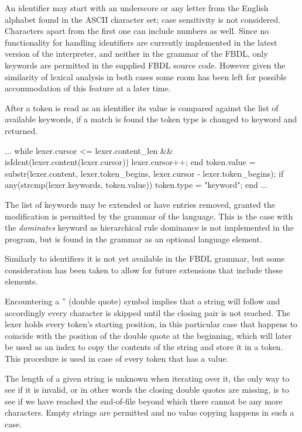 An identifier may start with an underscore or any letter from the English alphabet found in the ASCII character set; case sensitivity is not considered. Characters apart from the first one can include numbers as well. Since no functionality for handling identifiers are currently implemented in the latest version of the interpreter, and neither in the grammar of the FBDL, only keywords are permitted in the supplied FBDL source code. However given the similarity of lexical analysis in both cases some room has been left for possible accommodation of this feature at a later time.

After a token is read as an identifier its value is compared against the list of available keywords, if a match is found the token type is changed to keyword and returned.

\begin{octave}
...
while lexer.cursor <= lexer.content_len &&
		isIdent(lexer.content(lexer.cursor))
  lexer.cursor++;
end
token.value = substr(lexer.content, lexer.token_begins,
		lexer.cursor - lexer.token_begins);
if any(strcmp(lexer.keywords, token.value))
  token.type = "keyword";
end
...
\end{octave}

The list of keywords may be extended or have entries removed, granted the modification is permitted by the grammar of the language. This is the case with the \textit{dominates} keyword as hierarchical rule dominance is not implemented in the program, but is found in the grammar as an optional language element.

Similarly to identifiers it is not yet available in the FBDL grammar, but some consideration has been taken to allow for future extensions that include these elements.

Encountering a '' (double quote) symbol implies that a string will follow and accordingly every character is skipped until the closing pair is not reached. The lexer holds every token's starting position, in this particular case that happens to coincide with the position of the double quote at the beginning, which will later be used as an index to copy the contents of the string and store it in a token. This procedure is used in case of every token that has a value.

The length of a given string is unknown when iterating over it, the only way to see if it is invalid, or in other words the closing double quotes are missing, is to see if we have reached the end-of-file beyond which there cannot be any more characters. Empty strings are permitted and no value copying happens in such a case.

